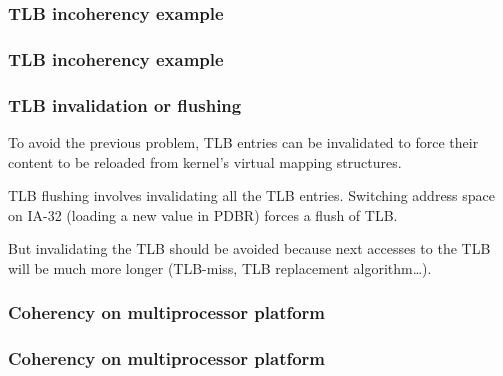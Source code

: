 
\begin{frame}
  \frametitle{TLB incoherency example}

  \begin{center}
  \end{center}

\end{frame}


\begin{frame}
  \frametitle{TLB incoherency example}

  \begin{center}
  \end{center}

\end{frame}


\begin{frame}
  \frametitle{TLB invalidation or flushing}

  To avoid the previous problem, TLB entries can be invalidated to
  force their content to be reloaded from kernel's virtual mapping
  structures.

  \-

  TLB flushing involves invalidating all the TLB entries. Switching
  address space on IA-32 (loading a new value in PDBR) forces a flush
  of TLB.

  \-

  But invalidating the TLB should be avoided because next accesses to the
  TLB will be much more longer (TLB-miss, TLB replacement algorithm\ldots).

\end{frame}


\begin{frame}
  \frametitle{Coherency on multiprocessor platform}

  \begin{center}
  \end{center}

\end{frame}


\begin{frame}
  \frametitle{Coherency on multiprocessor platform}

  \begin{center}
  \end{center}

\end{frame}

